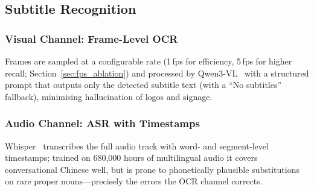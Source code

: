 \documentclass[mathematics,article,submit,xetex,moreauthors]{Definitions/mdpi}
\begin{document}
\subsection{Subtitle Recognition}
\label{sec:recognition}

\subsubsection{Visual Channel: Frame-Level OCR}
Frames are sampled at a configurable rate (1\,fps for efficiency, 5\,fps for higher recall; Section~\ref{sec:fps_ablation}) and processed by Qwen3-VL~\cite{qwen3vl2025} with a structured prompt that outputs only the detected subtitle text (with a ``No subtitles'' fallback), minimising hallucination of logos and signage.

\subsubsection{Audio Channel: ASR with Timestamps}
Whisper~\cite{radford2023robust} transcribes the full audio track with word- and segment-level timestamps; trained on 680{,}000 hours of multilingual audio it covers conversational Chinese well, but is prone to phonetically plausible substitutions on rare proper nouns---precisely the errors the OCR channel corrects.
\end{document}
